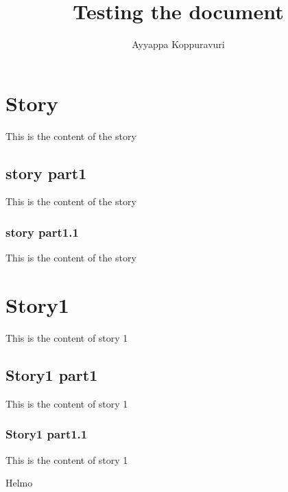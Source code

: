\documentclass{article}
\title{Testing the document}
\author{Ayyappa Koppuravuri}
\begin{document}
\maketitle
\tableofcontents

\section{Story}
This is the content of the story

\subsection{story part1}
This is the content of the story

\subsubsection{story part1.1}
This is the content of the story

\section{Story1}
This is the content of story 1

\subsection{Story1 part1}
This is the content of story 1

\subsubsection{Story1 part1.1}
This is the content of story 1

Helmo
\end{document}
